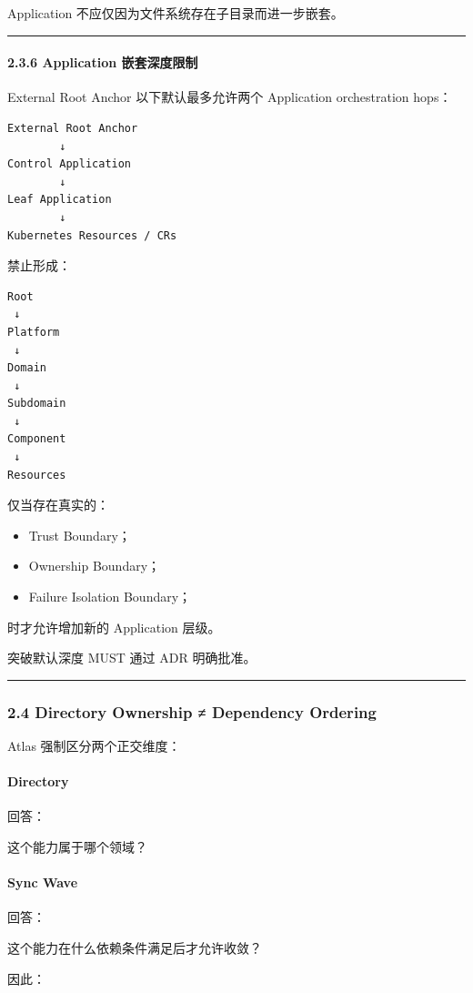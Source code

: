 \documentclass[11pt,a4paper]{article}
\begin{document}
Application 不应仅因为文件系统存在子目录而进一步嵌套。

\vspace{0.5em}\hrule\vspace{0.5em}
\paragraph{2.3.6 Application 嵌套深度限制}
External Root Anchor 以下默认最多允许两个 Application orchestration hops：

\begin{lstlisting}[language=text]
External Root Anchor
        ↓
Control Application
        ↓
Leaf Application
        ↓
Kubernetes Resources / CRs
\end{lstlisting}
禁止形成：

\begin{lstlisting}[language=text]
Root
 ↓
Platform
 ↓
Domain
 ↓
Subdomain
 ↓
Component
 ↓
Resources
\end{lstlisting}
仅当存在真实的：

\begin{itemize}
  \item Trust Boundary；
  \item Ownership Boundary；
  \item Failure Isolation Boundary；
\end{itemize}
时才允许增加新的 Application 层级。

突破默认深度 MUST 通过 ADR 明确批准。

\vspace{0.5em}\hrule\vspace{0.5em}
\subsubsection{2.4 Directory Ownership ≠ Dependency Ordering}
Atlas 强制区分两个正交维度：

\paragraph{Directory}
回答：

\begin{gfmBlockquote}
这个能力属于哪个领域？
\end{gfmBlockquote}
\paragraph{Sync Wave}
回答：

\begin{gfmBlockquote}
这个能力在什么依赖条件满足后才允许收敛？
\end{gfmBlockquote}
因此：
\end{document}
